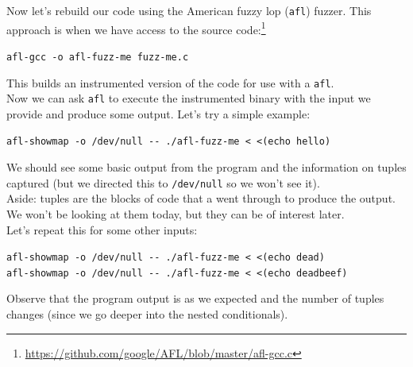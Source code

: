 \documentclass{article}
\begin{document}
\noindent Now let's rebuild our code using the American fuzzy lop (\lstinline{afl}) fuzzer. This
approach is when we have access to the source code:\footnote{\url{https://github.com/google/AFL/blob/master/afl-gcc.c}}
\begin{center}
    \lstinline{afl-gcc -o afl-fuzz-me fuzz-me.c}
\end{center}
\noindent This builds an instrumented version of the code for use with a \lstinline{afl}.\\

\noindent Now we can ask \lstinline{afl} to execute the instrumented binary with the input we
provide and produce some output. Let's try a simple example:
\begin{center}
    \lstinline{afl-showmap -o /dev/null -- ./afl-fuzz-me < <(echo hello)}
\end{center}
\noindent We should see some basic output from the program and the information on
tuples captured (but we directed this to \lstinline{/dev/null} so we won't see it).\\

\noindent Aside: tuples are the blocks of code that a
 went through to produce the
output. We won't be looking at them today, but they can be of interest later.\\

\noindent Let's repeat this for some other inputs:
\begin{center}
    \lstinline{afl-showmap -o /dev/null -- ./afl-fuzz-me < <(echo dead)}\\
    \lstinline{afl-showmap -o /dev/null -- ./afl-fuzz-me < <(echo deadbeef)}
\end{center}
Observe that the program output is as we expected and the number of tuples
changes (since we go deeper into the nested conditionals).\\
\end{document}

